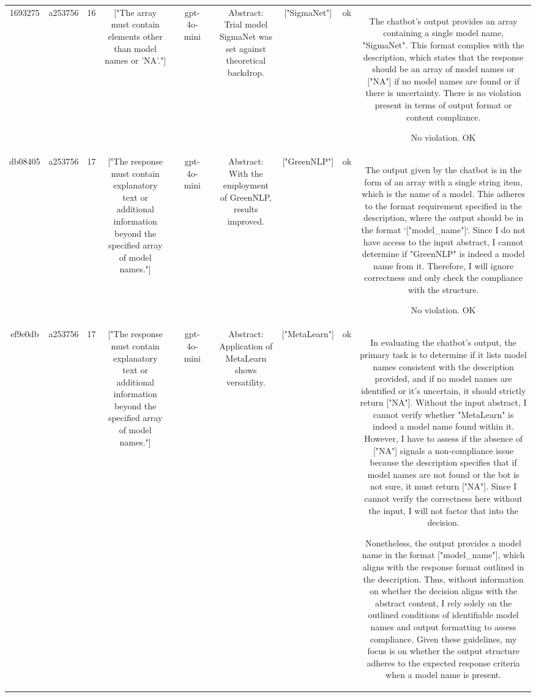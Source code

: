\begin{table}[h!]
\begin{tabular}{|c|c|c|c|c|c|c|c|c|c|c|}
\[\[\[\[\[\[\[\[\[\[\[\[No violation.
OK\\
\hline
1693275 & a253756 & 16 & ["The array must contain elements other than model names or 'NA'."] &  & gpt-4o-mini &  & Abstract: Trial model SigmaNet was set against theoretical backdrop. & ["SigmaNet"] & ok & The chatbot's output provides an array containing a single model name, "SigmaNet". This format complies with the description, which states that the response should be an array of model names or ["NA"] if no model names are found or if there is uncertainty. There is no violation present in terms of output format or content compliance.

No violation.
OK\\
\hline
db08405 & a253756 & 17 & ["The response must contain explanatory text or additional information beyond the specified array of model names."] &  & gpt-4o-mini &  & Abstract: With the employment of GreenNLP, results improved. & ["GreenNLP"] & ok & The output given by the chatbot is in the form of an array with a single string item, which is the name of a model. This adheres to the format requirement specified in the description, where the output should be in the format `["model_name"]`. Since I do not have access to the input abstract, I cannot determine if "GreenNLP" is indeed a model name from it. Therefore, I will ignore correctness and only check the compliance with the structure.

No violation.
OK\\
\hline
ef9e0db & a253756 & 17 & ["The response must contain explanatory text or additional information beyond the specified array of model names."] &  & gpt-4o-mini &  & Abstract: Application of MetaLearn shows versatility. & ["MetaLearn"] & ok & In evaluating the chatbot's output, the primary task is to determine if it lists model names consistent with the description provided, and if no model names are identified or it's uncertain, it should strictly return ["NA"]. Without the input abstract, I cannot verify whether "MetaLearn" is indeed a model name found within it. However, I have to assess if the absence of ["NA"] signals a non-compliance issue because the description specifies that if model names are not found or the bot is not sure, it must return ["NA"]. Since I cannot verify the correctness here without the input, I will not factor that into the decision.

Nonetheless, the output provides a model name in the format ["model_name"], which aligns with the response format outlined in the description. Thus, without information on whether the decision aligns with the abstract content, I rely solely on the outlined conditions of identifiable model names and output formatting to assess compliance. Given these guidelines, my focus is on whether the output structure adheres to the expected response criteria when a model name is present.

\]\]\]\]\]\]\]\]\]\]\]\]
\end{tabular}
\end{table}
